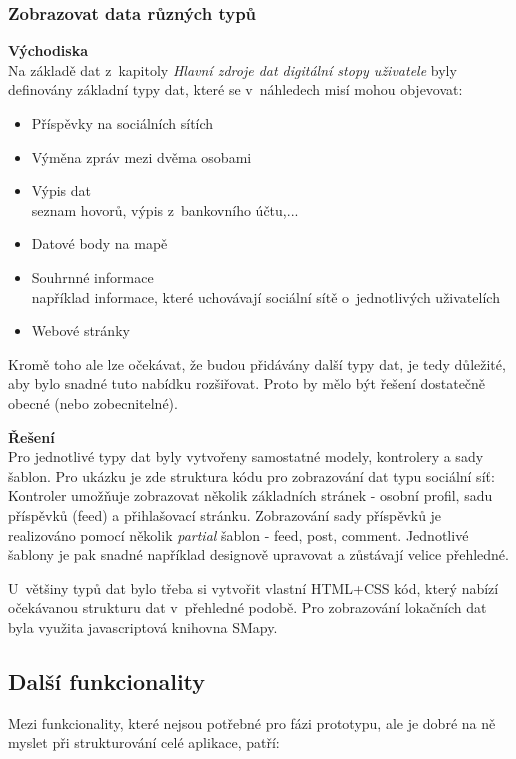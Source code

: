\subsubsection*{Zobrazovat data různých typů}
	\textbf{Východiska}\\
	Na základě dat z~kapitoly \textit{Hlavní zdroje dat digitální stopy uživatele} byly definovány základní typy dat, které se v~náhledech misí mohou objevovat:

	\begin{itemize}
		\item Příspěvky na sociálních sítích
		\item Výměna zpráv mezi dvěma osobami
		\item Výpis dat\\
			seznam hovorů, výpis z~bankovního účtu,...
		\item Datové body na mapě
		\item Souhrnné informace\\
			například informace, které uchovávají sociální sítě o~jednotlivých uživatelích
		\item Webové stránky
	\end{itemize}

	Kromě toho ale lze očekávat, že budou přidávány další typy dat, je tedy důležité, aby bylo snadné tuto nabídku rozšiřovat.
	Proto by mělo být řešení dostatečně obecné (nebo zobecnitelné). 

	\textbf{Řešení}\\
	Pro jednotlivé typy dat byly vytvořeny samostatné modely, kontrolery a sady šablon. Pro ukázku je zde struktura kódu pro zobrazování dat typu sociální síť:\\
	Kontroler umožňuje zobrazovat několik základních stránek - osobní profil, sadu příspěvků (feed) a přihlašovací stránku.
	Zobrazování sady příspěvků je realizováno pomocí několik \textit{partial} šablon - feed, post, comment. Jednotlivé šablony je pak snadné například designově upravovat a zůstávají velice přehledné.

	U~většiny typů dat bylo třeba si vytvořit vlastní HTML+CSS kód, který nabízí očekávanou strukturu dat v~přehledné podobě.
	Pro zobrazování lokačních dat byla využita javascriptová knihovna SMapy.   


\subsection{Další funkcionality}
Mezi funkcionality, které nejsou potřebné pro fázi prototypu, ale je dobré na ně myslet při strukturování celé aplikace, patří:

